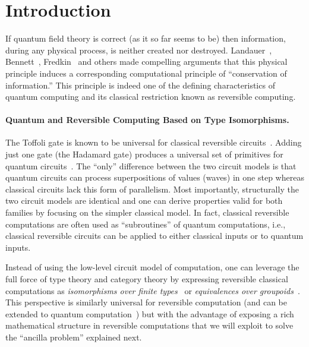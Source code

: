 \documentclass[sigplan,10pt,review,anonymous]{acmart}
\begin{document}






\section{Introduction}

If quantum field theory is correct (as it so far seems to be) then
information, during any physical process, is neither created nor
destroyed. Landauer~\cite{Landauer:1961,Landauer,bennett1985fundamental},
Bennett~\cite{bennett2010notes,bennett2003notes,Bennett:1973:LRC},
Fredkin~\cite{fredkin1982conservative} and others made compelling
arguments that this physical principle induces a corresponding
computational principle of ``conservation of information.'' This
principle is indeed one of the defining characteristics of quantum
computing and its classical restriction known as reversible computing.

\paragraph*{Quantum and Reversible Computing Based on Type
  Isomorphisms.} The Toffoli gate is known to be universal for
classical reversible circuits~\cite{Toffoli:1980}. Adding just one
gate (the Hadamard gate) produces a universal set of primitives for
quantum circuits~\cite{hadtoffuniv}. The ``only'' difference between
the two circuit models is that quantum circuits can process
superpositions of values (waves) in one step whereas classical
circuits lack this form of parallelism. Most importantly, structurally
the two circuit models are identical and one can derive properties
valid for both families by focusing on the simpler classical model. In
fact, classical reversible computations are often used as
``subroutines'' of quantum computations, i.e., classical reversible
circuits can be applied to either classical inputs or to quantum
inputs.

Instead of using the low-level circuit model of computation,
one can leverage the full force of type theory and category theory by
expressing reversible classical computations as \emph{isomorphisms
  over finite types}~\cite{Fiore:2004,James:2012:IE:2103656.2103667}
or \emph{equivalences over
  groupoids}~\cite{DBLP:conf/esop/CaretteS16}. This perspective is
similarly universal for reversible computation (and can be extended to
quantum computation~\cite{10.1007/978-3-319-89366-2_19}) but with the
advantage of exposing a rich mathematical structure in reversible
computations that we will exploit to solve the ``ancilla problem''
explained next.
\end{document}
